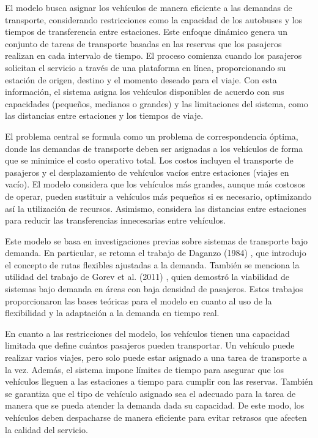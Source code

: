 \documentclass[preprint,11pt]{elsarticle}
\begin{document}
El modelo busca asignar los vehículos de manera eficiente a las demandas de transporte, considerando restricciones como la capacidad de los autobuses y los tiempos de transferencia entre estaciones. Este enfoque dinámico genera un conjunto de tareas de transporte basadas en las reservas que los pasajeros realizan en cada intervalo de tiempo. El proceso comienza cuando los pasajeros solicitan el servicio a través de una plataforma en línea, proporcionando su estación de origen, destino y el momento deseado para el viaje. Con esta información, el sistema asigna los vehículos disponibles de acuerdo con sus capacidades (pequeños, medianos o grandes) y las limitaciones del sistema, como las distancias entre estaciones y los tiempos de viaje.

El problema central se formula como un problema de correspondencia óptima, donde las demandas de transporte deben ser asignadas a los vehículos de forma que se minimice el costo operativo total. Los costos incluyen el transporte de pasajeros y el desplazamiento de vehículos vacíos entre estaciones (viajes en vacío). El modelo considera que los vehículos más grandes, aunque más costosos de operar, pueden sustituir a vehículos más pequeños si es necesario, optimizando así la utilización de recursos. Asimismo, considera las distancias entre estaciones para reducir las transferencias innecesarias entre vehículos.

Este modelo se basa en investigaciones previas sobre sistemas de transporte bajo demanda. En particular, se retoma el trabajo de Daganzo (1984) \cite{daganzo1984}, que introdujo el concepto de rutas flexibles ajustadas a la demanda. También se menciona la utilidad del trabajo de Gorev et al. (2011) \cite{gorev2020}, quien demostró la viabilidad de sistemas bajo demanda en áreas con baja densidad de pasajeros. Estos trabajos proporcionaron las bases teóricas para el modelo en cuanto al uso de la flexibilidad y la adaptación a la demanda en tiempo real.

En cuanto a las restricciones del modelo, los vehículos tienen una capacidad limitada que define cuántos pasajeros pueden transportar. Un vehículo puede realizar varios viajes, pero solo puede estar asignado a una tarea de transporte a la vez. Además, el sistema impone límites de tiempo para asegurar que los vehículos lleguen a las estaciones a tiempo para cumplir con las reservas. También se garantiza que el tipo de vehículo asignado sea el adecuado para la tarea de manera que se pueda atender la demanda dada su capacidad. De este modo, los vehículos deben despacharse de manera eficiente para evitar retrasos que afecten la calidad del servicio.
\end{document}
